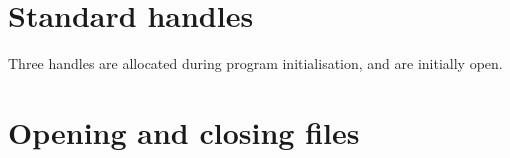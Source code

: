 \begin{haddockdesc}
\item[\begin{tabular}{@{}l}
instance Show Handle\\instance Eq Handle
\end{tabular}]
\end{haddockdesc}
\section{Standard handles}
Three handles are allocated during program initialisation, and are
 initially open.\par
\begin{haddockdesc}
\item[\begin{tabular}{@{}l}
stdin :: Handle
\end{tabular}]
\item[\begin{tabular}{@{}l}
stdout :: Handle
\end{tabular}]
\item[\begin{tabular}{@{}l}
stderr :: Handle
\end{tabular}]
\end{haddockdesc}
\section{Opening and closing files}
